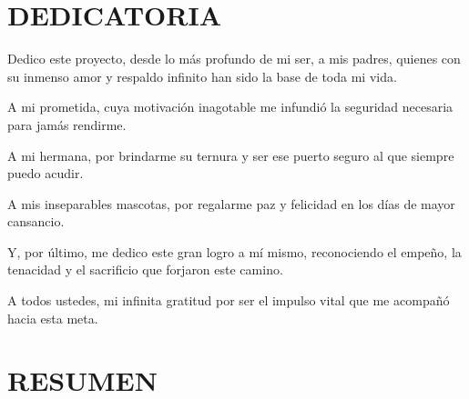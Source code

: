 \documentclass[12pt,a4paper,oneside]{report}
\begin{document}
\clearpage

\chapter*{DEDICATORIA}

\begin{flushright}
\begin{minipage}{0.65\textwidth}
\raggedleft
\itshape

Dedico este proyecto, desde lo más profundo de mi ser, a mis padres, quienes con su inmenso amor y respaldo infinito han sido la base de toda mi vida.

A mi prometida, cuya motivación inagotable me infundió la seguridad necesaria para jamás rendirme.

A mi hermana, por brindarme su ternura y ser ese puerto seguro al que siempre puedo acudir.

A mis inseparables mascotas, por regalarme paz y felicidad en los días de mayor cansancio.

Y, por último, me dedico este gran logro a mí mismo, reconociendo el empeño, la tenacidad y el sacrificio que forjaron este camino.

A todos ustedes, mi infinita gratitud por ser el impulso vital que me acompañó hacia esta meta.

\end{minipage}
\end{flushright}

\clearpage

\chapter*{RESUMEN}
\end{document}

